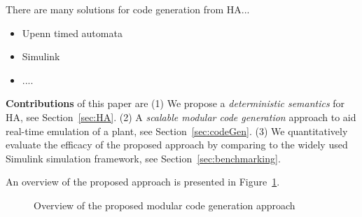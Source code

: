 There are many solutions for code generation from \acf{HA}...
\begin{itemize}
	\item Upenn timed automata
	\item Simulink
	\item ....
\end{itemize}
 
 \textbf{Contributions} of this paper are 
 (1) We propose a \emph{deterministic semantics} for \acf{HA}, see Section~\ref{sec:HA}.
 (2) A \emph{scalable modular code generation} approach 
 to aid real-time emulation of a plant, see Section~\ref{sec:codeGen}.
  (3) We quantitatively evaluate the efficacy of the 
  proposed approach by comparing  
   to the widely used Simulink\textsuperscript{\textregistered}
   simulation framework, see Section~\ref{sec:benchmarking}.
   
 An overview of the proposed approach is presented
 in Figure~\ref{fig:overview}.
 
 \begin{figure}[bthp]
 	\centering
 	\scalebox{0.7}{
	 
	}
	 \caption{Overview of the proposed modular 
	 	code generation approach \label{fig:overview}}
\end{figure}
      
 
 
